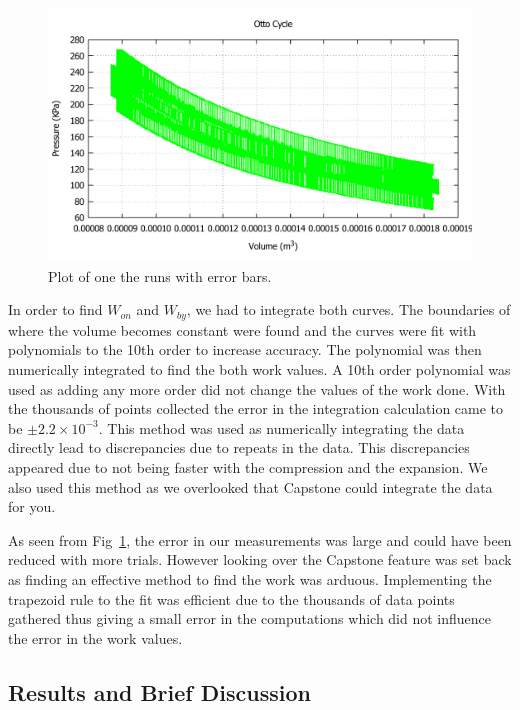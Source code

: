 \documentclass[11pt,letterpaper,onecolumn]{article}
\begin{document}
\begin{figure}[H]
\begin{center}
\includegraphics*[scale = .6]{OttoErr.pdf}
\caption{Plot of one the runs with error bars.~\label{fig:results} }
\end{center}
\end{figure}

In order to find $W_{on}$ and $W_{by}$, we had to integrate both curves. The boundaries of where the volume becomes constant were found and the curves were fit with polynomials to the 10th order to increase accuracy. The polynomial was then numerically integrated to find the both work values. A 10th order polynomial was used as adding any more order did not change the values of the work done. With the thousands of points collected the error in the integration calculation came to be $\pm2.2\times10^{-3}$. This method was used as numerically integrating the data directly lead to discrepancies due to repeats in the data. This discrepancies appeared due to not being faster with the compression and the expansion. We also used this method as we overlooked that Capstone could integrate the data for you.

As seen from Fig~\ref{fig:results}, the error in our measurements was large and could have been reduced with more trials. However looking over the Capstone feature was  set back as finding an effective method to find the work was arduous. Implementing the trapezoid rule to the fit was efficient due to the thousands of data points gathered thus giving a small error in the computations which did not influence the error in the work values. 


\subsection{Results and Brief Discussion}
\end{document}
